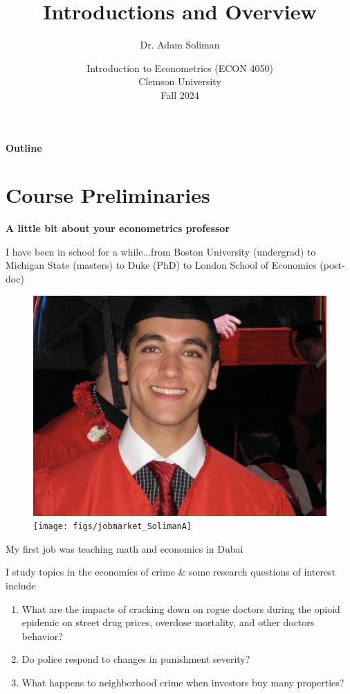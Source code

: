 \documentclass[11pt, aspectratio=169]{beamer}
\newenvironment{wideitemize}{\itemize\addtolength{\itemsep}{5pt}}{\enditemize}
\begin{document}
	 

\title{Introductions and Overview}
\author{Dr. Adam Soliman}
\date{Introduction to Econometrics (ECON 4050) \\ Clemson University\\Fall 2024} 

\begin{frame}
	\maketitle
\end{frame}	
 
\begin{frame}{\bf \large Outline}
	\tableofcontents
\end{frame} 

\section{Course Preliminaries}

\begin{frame}{\bf \large A little bit about your econometrics professor}
	
	\begin{wideitemize}
		\item I have been in school for a while...from Boston University (undergrad) to Michigan State (masters) to Duke (PhD) to London School of Economics (post-doc)
\begin{figure}[htbp!]
	\centering
	\includegraphics[width=0.23\linewidth]{figs/collegegrad_Soliman} \texttt{[image: figs/jobmarket\_SolimanA]}
\end{figure}		
		\item My first job was teaching math and economics in Dubai

\pause 
		\item I study topics in the economics of crime \& some research questions of interest include
		\begin{enumerate}
			\item What are the impacts of cracking down on rogue doctors during the opioid epidemic on street drug prices, overdose mortality, and other doctors behavior?
			\item Do police respond to changes in punishment severity?
			\item What happens to neighborhood crime when investors buy many properties?
		\end{enumerate}
	\end{wideitemize}
\end{frame}
\end{document}
